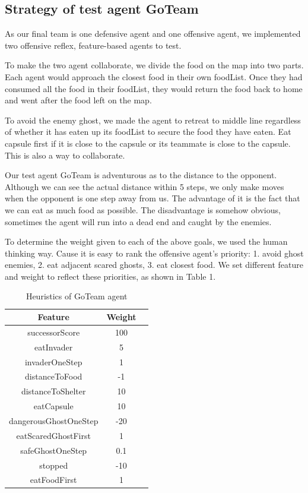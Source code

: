 \subsection{Strategy of test agent GoTeam}
As our final team is one defensive agent and one offensive agent, we
implemented two offensive reflex, feature-based agents to test. 

To make the two agent collaborate, we divide the food on the map into two parts.
Each agent would approach the closest food in their own foodList.  Once they had consumed 
all the food in their foodList, they would return the food back to home and went after the 
food left on the map. 

To avoid the enemy ghost, we made the agent to retreat to middle line regardless of whether it
has eaten up its foodList to secure the food they have eaten.  Eat capsule first if it is close 
to the capsule or its teammate is close to the capsule.  This is also a way to collaborate.

Our test agent GoTeam is adventurous as to the distance to the opponent.  Although we can see 
the actual distance within 5 steps, we only make moves when the opponent is one step away from
us.  The advantage of it is the fact that we can eat as much food as possible. The disadvantage is somehow 
obvious, sometimes the agent will run into a dead end and caught by the enemies.

To determine the weight given to each of the above goals, we used the human thinking way.
Cause it is easy to rank the offensive agent's priority: 1. avoid ghost enemies, 2. eat
adjacent scared ghosts, 3. eat closest food. We set different feature and weight to reflect 
these priorities, as shown in Table 1.

\begin{table}[!htb]
  \caption{Heuristics of GoTeam agent}
  \label{3}
  \begin{tabular}{ccl}
    \toprule
    Feature&Weight\\
    \midrule
    successorScore & 100\\
    eatInvader & 5\\
    invaderOneStep & 1\\
    distanceToFood & -1\\
    distanceToShelter & 10\\
    eatCapsule & 10\\
    dangerousGhostOneStep & -20\\
    eatScaredGhostFirst & 1\\
    safeGhostOneStep & 0.1\\
    stopped & -10 \\
    eatFoodFirst & 1\\
  \bottomrule
\end{tabular}
\end{table}


